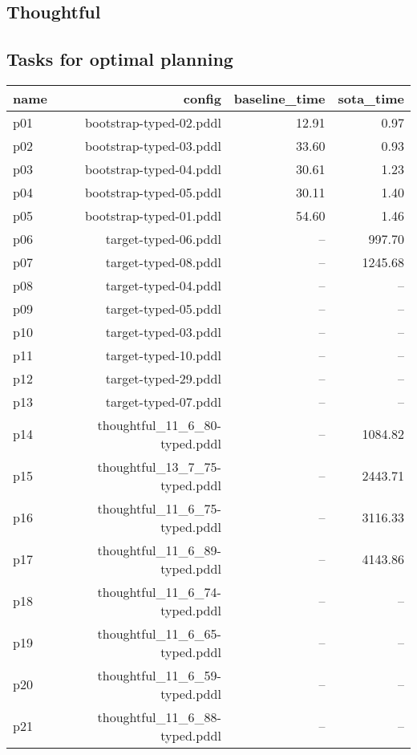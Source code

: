 \documentclass{article}
\begin{document}
                \newpage \subsection{Thoughtful}
                    \subsection*{Tasks for optimal planning}
                    
                            \begin{center}
                            \scriptsize
                            \begin{tabular}{@{}l|r|r|r@{}}
                            name & config & baseline\_time & sota\_time\\\midrule
                              p01& bootstrap-typed-02.pddl&12.91&0.97\\
  p02& bootstrap-typed-03.pddl&33.60&0.93\\
  p03& bootstrap-typed-04.pddl&30.61&1.23\\
  p04& bootstrap-typed-05.pddl&30.11&1.40\\
  p05& bootstrap-typed-01.pddl&54.60&1.46\\
  p06& target-typed-06.pddl&--&997.70\\
  p07& target-typed-08.pddl&--&1245.68\\
  p08& target-typed-04.pddl&--&--\\
  p09& target-typed-05.pddl&--&--\\
  p10& target-typed-03.pddl&--&--\\
  p11& target-typed-10.pddl&--&--\\
  p12& target-typed-29.pddl&--&--\\
  p13& target-typed-07.pddl&--&--\\
  p14& thoughtful\_11\_6\_80-typed.pddl&--&1084.82\\
  p15& thoughtful\_13\_7\_75-typed.pddl&--&2443.71\\
  p16& thoughtful\_11\_6\_75-typed.pddl&--&3116.33\\
  p17& thoughtful\_11\_6\_89-typed.pddl&--&4143.86\\
  p18& thoughtful\_11\_6\_74-typed.pddl&--&--\\
  p19& thoughtful\_11\_6\_65-typed.pddl&--&--\\
  p20& thoughtful\_11\_6\_59-typed.pddl&--&--\\
  p21& thoughtful\_11\_6\_88-typed.pddl&--&--\\

\end{tabular}
\end{center}
\end{document}
